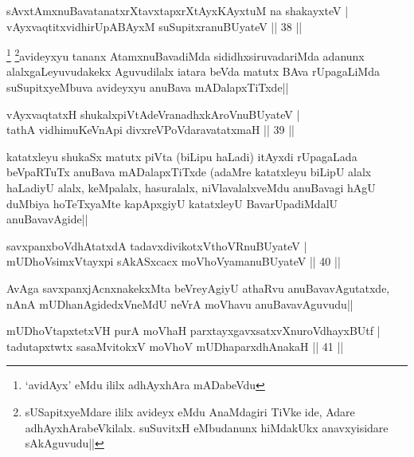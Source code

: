 
\begin{shl}
sAvxtAmxnuBavatanatxrXtavxtapxrXtAyxKAyxtuM na shakayxteV |\\
vAyxvaqtitxvidhirUpABAyxM suSupitxranuBUyateV \hfill || 38 ||
\end{shl}

\begin{artha}
\footnote[1]{`avidAyx' eMdu ililx adhAyxhAra mADabeVdu} \footnote[2]{sUSapitxyeMdare ililx avideyx eMdu AnaMdagiri TiVke ide, Adare adhAyxhArabeVkilalx. suSuvitxH eMbudanunx hiMdakUkx anavxyisidare sAkAguvudu||}avideyxyu tananx AtamxnuBavadiMda sididhxsiruvadariMda adanunx alalxgaLeyuvudakekx Aguvudilalx iatara beVda matutx BAva rUpagaLiMda suSupitxyeMbuva avideyxyu anuBava mADalapxTiTxde||
\end{artha}


\begin{shl}
vAyxvaqtatxH shukalxpiVtAdeVranadhxkAroV\s nuBUyateV |\\
tathA vidhimuKeVnApi divxreVPoVdaravatatxmaH \hfill || 39 ||
\end{shl}

\begin{artha}
katatxleyu shukaSx matutx piVta (biLipu haLadi) itAyxdi rUpagaLada beVpaRTuTx anuBava mADalapxTiTxde (adaMre katatxleyu biLipU alalx haLadiyU alalx, keMpalalx, hasuralalx, niVlavalalxveMdu anuBavagi hAgU duMbiya hoTeTxyaMte kapApxgiyU katatxleyU BavarUpadiMdalU anuBavavAgide||
\end{artha}

\begin{shl}
savxpanxboVdhAtatxdA tadavxdivikotxV\s thoVR\s nuBUyateV |\\
mUDhoV\s simxVtayxpi sAkASxcacx moVhoV\s yamanuBUyateV \hfill || 40 ||
\end{shl}

\begin{artha}
AvAga savxpanxjAcnxnakekxMta beVreyAgiyU athaRvu anuBavavAgutatxde, nAnA mUDhanAgidedxVneMdU neVrA moVhavu anuBavavAguvudu||
\end{artha}%


\begin{shl}
mUDhoVtapxtetxVH purA moVhaH parxtayxgavxsatxvXnuroVdhayxBUtf |\\
tadutapxtwtx sasaMvitokxV moVhoV mUDhaparxdhAnakaH \hfill || 41 ||
\end{shl}

